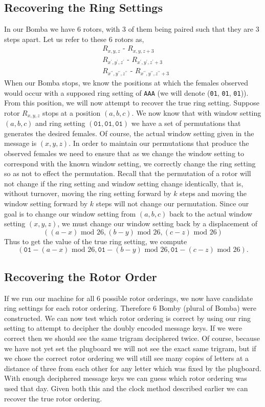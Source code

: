 \subsection{Recovering the Ring Settings}
In our Bomba we have 6 rotors, with 3 of them being paired such that
they are 3 steps apart. Let us refer to these 6 rotors as,
\begin{align*}
	 & R_{x,y,z} \texttt{ - } R_{x,y,z+3}
	\\
	 & R_{x^\prime,y^\prime,z^\prime} \texttt{ - }
	R_{x^\prime,y^\prime,z^\prime+3}
	\\
	 & R_{x^{\prime\prime},y^{\prime\prime},z^{\prime\prime}} \texttt{ -
	} R_{x^{\prime\prime},y^{\prime\prime},z^{\prime\prime}+3}
\end{align*}
When our Bomba stops, we know the positions at which the females
observed would occur with a supposed ring setting of \texttt{AAA} (we
will denote (\texttt{01}, \texttt{01}, \texttt{01})).
From this position, we will now attempt to recover the true ring
setting. Suppose rotor $R_{x,y,z}$ stops at a position $(a,b,c)$. We
now know that with window setting $(a,b,c)$ and ring setting
$(\texttt{01}, \texttt{01}, \texttt{01})$ we have a set of
permutations that generates the desired females. Of course, the
actual window setting given in the message is $(x,y,z)$. In order to
maintain our permutations that produce the observed females we need
to ensure that as we change the window setting to correspond with the
known window setting, we correctly change the ring setting so as not
to effect the permutation. Recall that the permutation of a rotor
will not change if the ring setting and window setting change
identically, that is, without turnover, moving the ring setting
forward by $k$ steps and moving the window setting forward by $k$
steps will not change our permutation. Since our goal is to change
our window setting from $(a,b,c)$ back to the actual window setting
$(x,y,z)$, we must change our window setting back by a displacement of
\[
	((a-x)\text{ mod } 26, (b-y)\text{ mod }26, (c-z)\text{ mod }26)
\]
Thus to get the value of the true ring setting, we compute
\[
	(\texttt{01} - (a- x)\text{ mod }26, \texttt{01} - (b- y)\text{ mod
	}26, \texttt{01} - (c-
	z)\text{ mod }26).
\]

\subsection{Recovering the Rotor Order}
If we run our machine for all $6$ possible rotor orderings, we now
have candidate ring settings for each rotor ordering. Therefore $6$
Bomby (plural of Bomba) were constructed. We can now test
which rotor ordering is correct by using our ring setting to attempt
to decipher the doubly encoded message keys. If we were correct then
we should see the same trigram deciphered twice. Of course, because
we have not yet set the plugboard we will not see the exact same
trigram, but if we chose the correct rotor ordering we will still see
many copies of letters at a distance of three from each other for any
letter which was fixed by the plugboard. With enough deciphered
message keys we can guess which rotor ordering was used that day.
Given both this and the clock method described earlier we can recover
the true rotor ordering.

